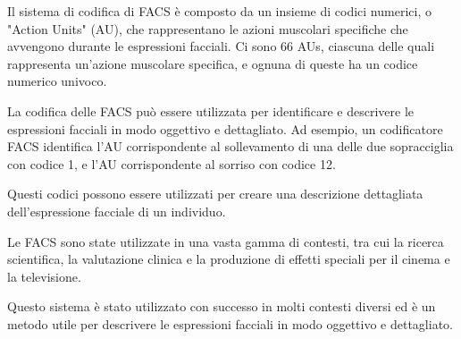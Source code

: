 Il sistema di codifica di FACS è composto da un insieme di codici numerici, o "Action Units" (AU), che rappresentano le azioni muscolari specifiche che avvengono durante le espressioni facciali. Ci sono 66 AUs, ciascuna delle quali rappresenta un'azione muscolare specifica, e ognuna di queste ha un codice numerico univoco.

La codifica delle FACS può essere utilizzata per identificare e descrivere le espressioni facciali in modo oggettivo e dettagliato. Ad esempio, un codificatore FACS identifica l'AU corrispondente al sollevamento di una delle due sopracciglia con codice 1, e l'AU corrispondente al sorriso con codice 12. 

Questi codici possono essere utilizzati per creare una descrizione dettagliata dell'espressione facciale di un individuo.

Le FACS sono state utilizzate in una vasta gamma di contesti, tra cui la ricerca scientifica, la valutazione clinica e la produzione di effetti speciali per il cinema e la televisione. 

Questo sistema è stato utilizzato con successo in molti contesti diversi ed è un metodo utile per descrivere le espressioni facciali in modo oggettivo e dettagliato. 

